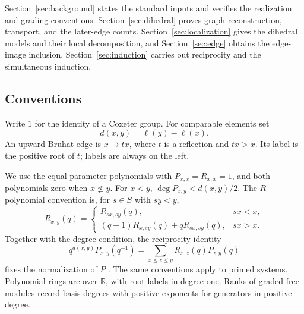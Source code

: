 Section~\ref{sec:background} states the standard inputs and verifies the
realization and grading conventions. Section~\ref{sec:dihedral} proves
graph reconstruction, transport, and the later-edge counts.
Section~\ref{sec:localization} gives
the dihedral models and their local decomposition, and
Section~\ref{sec:edge} obtains the edge-image inclusion.
Section~\ref{sec:induction} carries out reciprocity and the simultaneous
induction.

\subsection{Conventions}
Write $1$ for the identity of a Coxeter group. For comparable elements set
\[
 d(x,y)=\ell(y)-\ell(x).
\]
An upward Bruhat edge is $x\to tx$, where $t$ is a reflection and $tx>x$.
Its label is the positive root of $t$; labels are always on the left.

We use the equal-parameter polynomials with $P_{x,x}=R_{x,x}=1$, and
both polynomials zero when $x\not\le y$.
For $x<y$, $\deg P_{x,y}<d(x,y)/2$.
The $R$-polynomial convention is, for $s\in S$ with $sy<y$,
\[
 R_{x,y}(q)=
 \begin{cases}
 R_{sx,sy}(q),&sx<x,\\
 (q-1)R_{x,sy}(q)+qR_{sx,sy}(q),&sx>x.
 \end{cases}
\]
Together with the degree condition, the reciprocity identity
\begin{equation}\label{eq:reciprocity}
 q^{d(x,y)}P_{x,y}(q^{-1})
 =\sum_{x\le z\le y}R_{x,z}(q)P_{z,y}(q)
\end{equation}
fixes the normalization of $P$ \cite{KL79}.
The same conventions apply to primed systems.
Polynomial rings are over $\mathbb R$, with root labels in degree one.
Ranks of graded free modules record basis degrees with positive
exponents for generators in positive degree.
